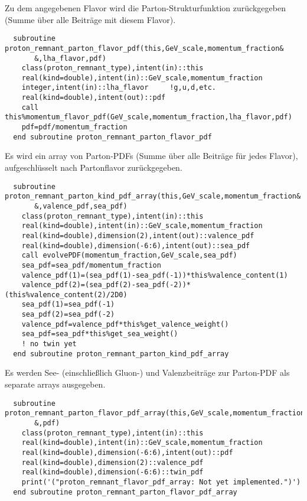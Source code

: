 Zu dem angegebenen Flavor wird die Parton-Strukturfunktion zurückgegeben (Summe über alle Beiträge mit diesem Flavor).
\begin{Verbatim}
  subroutine proton_remnant_parton_flavor_pdf(this,GeV_scale,momentum_fraction&
       &,lha_flavor,pdf)
    class(proton_remnant_type),intent(in)::this
    real(kind=double),intent(in)::GeV_scale,momentum_fraction
    integer,intent(in)::lha_flavor     !g,u,d,etc.
    real(kind=double),intent(out)::pdf
    call this%momentum_flavor_pdf(GeV_scale,momentum_fraction,lha_flavor,pdf)
    pdf=pdf/momentum_fraction
  end subroutine proton_remnant_parton_flavor_pdf
\end{Verbatim}  
Es wird ein array von Parton-PDFs (Summe über alle Beiträge für jedes Flavor), aufgeschlüsselt nach Partonflavor zurückgegeben.

\begin{Verbatim}
  subroutine proton_remnant_parton_kind_pdf_array(this,GeV_scale,momentum_fraction&
       &,valence_pdf,sea_pdf)
    class(proton_remnant_type),intent(in)::this
    real(kind=double),intent(in)::GeV_scale,momentum_fraction
    real(kind=double),dimension(2),intent(out)::valence_pdf
    real(kind=double),dimension(-6:6),intent(out)::sea_pdf
    call evolvePDF(momentum_fraction,GeV_scale,sea_pdf)
    sea_pdf=sea_pdf/momentum_fraction
    valence_pdf(1)=(sea_pdf(1)-sea_pdf(-1))*this%valence_content(1)
    valence_pdf(2)=(sea_pdf(2)-sea_pdf(-2))*(this%valence_content(2)/2D0)
    sea_pdf(1)=sea_pdf(-1)
    sea_pdf(2)=sea_pdf(-2)
    valence_pdf=valence_pdf*this%get_valence_weight()
    sea_pdf=sea_pdf*this%get_sea_weight()
    ! no twin yet
  end subroutine proton_remnant_parton_kind_pdf_array
\end{Verbatim}
Es werden See- (einschließlich Gluon-) und Valenzbeiträge zur Parton-PDF als separate arrays ausgegeben.
\begin{Verbatim}
  subroutine proton_remnant_parton_flavor_pdf_array(this,GeV_scale,momentum_fraction&
       &,pdf)
    class(proton_remnant_type),intent(in)::this
    real(kind=double),intent(in)::GeV_scale,momentum_fraction
    real(kind=double),dimension(-6:6),intent(out)::pdf
    real(kind=double),dimension(2)::valence_pdf
    real(kind=double),dimension(-6:6)::twin_pdf
    print('("proton_remnant_flavor_pdf_array: Not yet implemented.")')
  end subroutine proton_remnant_parton_flavor_pdf_array
\end{Verbatim}

